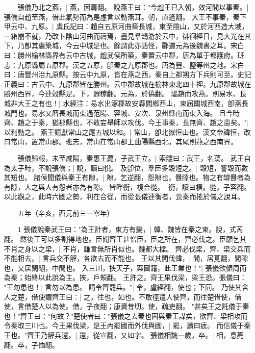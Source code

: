 　　張儀乃北之燕，|{
	燕，因肩翻。
	}
說燕王曰："今趙王已入朝，效河間以事秦。|{
	張儀自趙至燕，借此氣勢而為是虛言以動燕耳。朝，直遙翻。
	}
大王不事秦，秦下甲云中、九原。|{
	虞氏記曰：趙自五原河曲築長城，東至陰山，又於河西造大城，一箱崩不就，乃改卜陰山河曲而禱焉，晝見羣鵠游於云中，徘徊經日，見大光在其下，乃卽其處築城，今云中城是也。餘謂此亦語怪，酈道元為後魏書之耳。宋白曰：勝州榆林縣界有云中古城，趙武侯所築，秦置云中郡，唐為單于都護府。班志：九原縣屬五原郡。漢之五原，卽秦之九原郡也。唐為豐、鹽等州之地。宋白曰：唐豐州治九原縣。按云中九原，皆在燕之西，秦自上郡朔方下兵則可至。史記正義曰：古云中、九原郡皆在勝州。云中郡故城在榆林東北四十裡。九原郡故城在勝州西界，今連穀縣是。下，遐稼翻。元為，於偽翻。
	}
驅趙而攻燕。則易水、長城非大王之有也！|{
	水經注：易水出涿郡故安縣閻鄉西山，東屆關城西南，卽燕長城門也。易水又曆長城而東過范陽、容城、安次、泉州縣南而東入海。
	}
且今時齊、趙之于秦，猶郡縣也，不敢妄舉師以攻伐。今王事秦，長無齊、趙之患矣。"|{
	以利動之。
	}
燕王請獻常山之尾五城以和。|{
	常山，卽北嶽恒山也。漢文帝諱恒，改曰常山，置常山郡。班志，常山在常山郡上曲陽縣西北，其尾則燕之西南界。
	}

　　張儀歸報，未至咸陽，秦惠王薨，子武王立。|{
	索隱曰：武王，名蕩。
	}
武王自為太子時，不說張儀；|{
	說，讀曰悅。
	}
及卽位，羣臣多毀短之。|{
	毀短，訾毀而數其短也。
	}
諸侯聞儀與秦王有隙，|{
	隙，乞逆翻，怨隙也，釁隙也。物之有罅釁者為有隙，人之與人有怨者亦為有隙。
	}
皆畔衡，複合從。|{
	衡，讀曰橫。從，子容翻。以此觀之，此時六國之勢，利在合從，而從張儀連衡者，畏秦而搖於儀之說耳。
	}

　　五年（辛亥，西元前三一零年）

　　1 張儀說秦武王曰："為王計者，東方有變，|{
	韓、魏皆在秦之東。說，式芮翻。
	}
然後王可以多割得地也。臣聞齊王甚憎臣，臣之所在，齊必伐之。臣願乞其不肖之身以之梁，|{
	不肖，謙言無所肖似也。魏都大樑。
	}
齊必伐梁，齊、梁交兵而不能相去，|{
	言兵交不解，各欲去而不能也。
	}
王以其間伐韓，|{
	間，居莧翻，間隙也，又居閑翻，中間也。
	}
入三川，挾天子，案圖籍，此王業也！"|{
	張儀欲傾周而為秦；始終以此說為主。挾，戶頰翻。
	}
王許之。齊王果伐梁，梁王恐。張儀曰： "王勿患也！|{
	言勿以為患。
	}
請令齊罷兵。"|{
	令，盧經翻，使也；下同。
	}
乃使其舍人之楚，借使謂齊王曰：|{
	之，往也，如也。不敢徑遣人使齊，而往楚借使，借使，言借楚人以為使。借，子夜翻；康資昔切。使，疏吏翻。
	}
"甚矣王之託儀于秦也！"齊王曰："何故？"楚使者曰："張儀之去秦也固與秦王謀矣，欲齊、梁相攻而令秦取三川也。今王果伐梁，是王內罷國而外伐與國，|{
	罷，讀曰疲。
	}
而信儀于秦王也。"齊王乃解兵還。|{
	還，從宣翻，又如字。
	}
張儀相魏一歲，卒。|{
	相，息亮翻。卒，子恤翻。
	}

